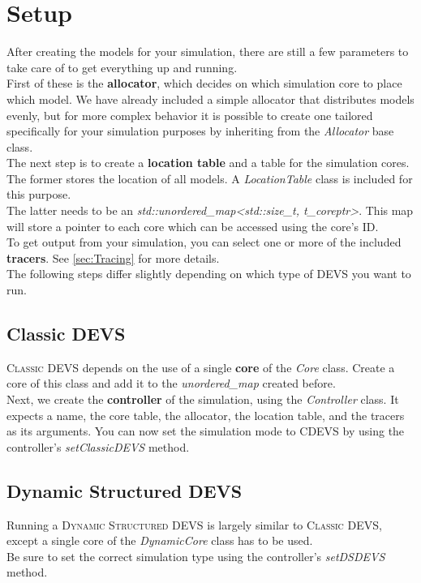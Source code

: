 \section{Setup}

After creating the models for your simulation, there are still a few parameters to take care of to get everything up and running.\\

First of these is the \textbf{allocator}, which decides on which simulation core to place which model. We have already included a simple allocator that distributes models evenly, but for more complex behavior it is possible to create one tailored specifically for your simulation purposes by inheriting from the \textsl{Allocator} base class.\\

The next step is to create a \textbf{location table} and a table for the simulation cores. The former stores the location of all models. A \textsl{LocationTable} class is included for this purpose.\\
The latter needs to be an \textsl{std::unordered\_map{\textless}std::size\_t, t\_coreptr{\textgreater}}. This map will store a pointer to each core which can be accessed using the core's ID.\\

To get output from your simulation, you can select one or more of the included \textbf{tracers}. See \ref{sec:Tracing} for more details.\\

The following steps differ slightly depending on which type of DEVS you want to run.

\subsection{Classic DEVS}
\textsc{Classic DEVS} depends on the use of a single \textbf{core} of the \textsl{Core} class. Create a core of this class and add it to the \textsl{unordered\_map} created before.\\

Next, we create the \textbf{controller} of the simulation, using the \textsl{Controller} class. It expects a name, the core table, the allocator, the location table, and the tracers as its arguments. You can now set the simulation mode to CDEVS by using the controller's \textsl{setClassicDEVS} method.

\subsection{Dynamic Structured DEVS}
Running a \textsc{Dynamic Structured DEVS} is largely similar to \textsc{Classic DEVS}, except a single core of the \textsl{DynamicCore} class has to be used.\\
Be sure to set the correct simulation type using the controller's \textsl{setDSDEVS} method.

